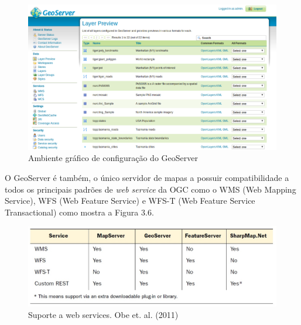 		\begin{figure}
			\centering
			\includegraphics[width=1\linewidth]{data/geoserver_gui}
			\caption{Ambiente gráfico de configuração do GeoServer}
			\label{fig:geoservergui}
		\end{figure}
	
		O GeoServer é também, o único servidor de mapas a possuir compatibilidade a todos os principais padrões de \textit{web service} da OGC como o WMS (Web Mapping Service), WFS (Web Feature Service) e WFS-T (Web Feature Service Transactional) como mostra a Figura 3.6.
		
		\begin{figure}
			\centering
			\includegraphics[width=1\linewidth]{data/suporte_webservices}
			\caption{Suporte a web services. Obe et. al. (2011)}
			\label{fig:suportewebservices}
		\end{figure}
		

